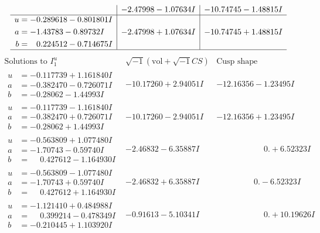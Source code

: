 \documentclass[1p]{elsarticle_modified}
\theoremstyle{definition}
\newcommand{\I}{\sqrt{-1}}
\begin{document}
$$\begin{array}{c|c|c}
 & -2.47998 - 1.07634 I & -10.74745 - 1.48815 I \\ \hline\begin{aligned}
u &= -0.289618 - 0.801801 I \\
a &= -1.43783 - 0.89732 I \\
b &= \phantom{-}0.224512 - 0.714675 I\end{aligned}
 & -2.47998 + 1.07634 I & -10.74745 + 1.48815 I\\
 \hline 
 \end{array}$$\newpage$$\begin{array}{c|c|c}  
\text{Solutions to }I^u_{1}& \I (\text{vol} + \sqrt{-1}CS) & \text{Cusp shape}\\
 \hline 
\begin{aligned}
u &= -0.117739 + 1.161840 I \\
a &= -0.382470 - 0.726071 I \\
b &= -0.28062 - 1.44993 I\end{aligned}
 & -10.17260 + 2.94051 I & -12.16356 - 1.23495 I \\ \hline\begin{aligned}
u &= -0.117739 - 1.161840 I \\
a &= -0.382470 + 0.726071 I \\
b &= -0.28062 + 1.44993 I\end{aligned}
 & -10.17260 - 2.94051 I & -12.16356 + 1.23495 I \\ \hline\begin{aligned}
u &= -0.563809 + 1.077480 I \\
a &= -1.70743 - 0.59740 I \\
b &= \phantom{-}0.427612 - 1.164930 I\end{aligned}
 & -2.46832 - 6.35887 I & \phantom{-0.000000 -}0. + 6.52323 I \\ \hline\begin{aligned}
u &= -0.563809 - 1.077480 I \\
a &= -1.70743 + 0.59740 I \\
b &= \phantom{-}0.427612 + 1.164930 I\end{aligned}
 & -2.46832 + 6.35887 I & \phantom{-0.000000 } 0. - 6.52323 I \\ \hline\begin{aligned}
u &= -1.121410 + 0.484988 I \\
a &= \phantom{-}0.399214 - 0.478349 I \\
b &= -0.210445 + 1.103920 I\end{aligned}
 & -0.91613 - 5.10341 I & \phantom{-0.000000 -}0. + 10.19626 I \\ \hline\begin{aligned}

\end{aligned}
\end{array}$$
\end{document}
